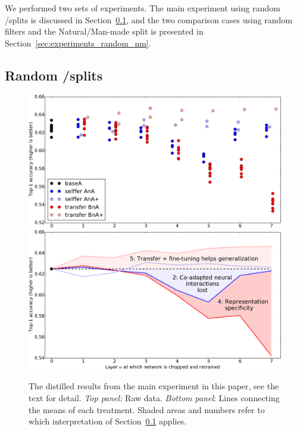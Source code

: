 We performed two sets of experiments. The main experiment using random \dA/\dB splits is discussed in Section~\ref{sec:experiments_ab}, and the two comparison cases using random filters and the Natural/Man-made split is presented in Section~\ref{sec:experiments_random_nm}.




\subsection{Random \dA/\dB splits}
\label{sec:experiments_ab}


\begin{figure}[t]
\begin{center}
\includegraphics[width=.9\linewidth]{plots/result_transfer_crop.pdf}
\includegraphics[width=.9\linewidth]{plots/result_transfer_lines_crop.pdf}
\end{center}
\caption{The distilled results from the main experiment in this paper, see the text for detail. \emph{Top panel:} Raw data. \emph{Bottom panel}: Lines connecting the means of each treatment. Shaded areas and numbers refer to which interpretation of Section~\ref{sec:experiments_ab} applies.
}
\label{fig:results}
\end{figure}

